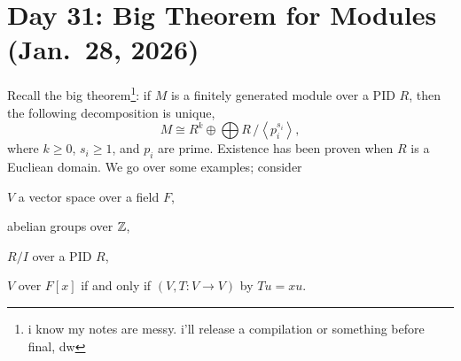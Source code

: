 \section{Day 31: Big Theorem for Modules (Jan.\ 28, 2026)}
Recall the big theorem\footnote{i know my notes are messy. i'll release a compilation or something before final, dw}: if $M$ is a finitely generated module over a PID $R$, then the following decomposition is unique,
\[ M \cong R^k \oplus \bigoplus R\,/\!\left<p_i^{s_i}\right>, \]
where $k \geq 0$, $s_i \geq 1$, and $p_i$ are prime. Existence has been proven when $R$ is a Eucliean domain. We go over some examples; consider \begin{parlist} \item $V$ a vector space over a field $F$, \item abelian groups over $\mathbb Z$, \item $R/I$ over a PID $R$, \item $V$ over $F[x]$ if and only if $(V, T \colon V \to V)$ by $Tu = xu$. \end{parlist}
